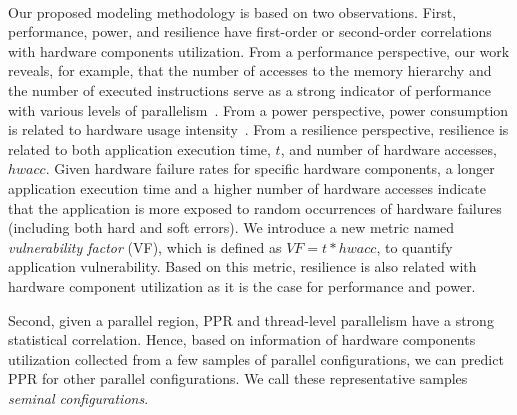 \documentclass{article}  %
\begin{document}


\vspace{10pt}

  \\
Our proposed modeling methodology is based on two observations.
First, performance, power, and resilience have first-order or
second-order correlations with hardware components utilization.
From a performance perspective, our work reveals, for example, that
the number of accesses to the memory hierarchy and the number of
executed instructions serve as a strong indicator of performance with
various levels of parallelism~\cite{mpiopenmp_tpds13,
  mpiopenmp_ipdps10, dct_pmbs11, dct_iiswc12}. 
From a power perspective, power consumption is related to hardware
usage intensity~\cite{leon:14:characterizing,mpiopenmp_tpds13, powermodel_sigmetrics03, powermodel_micro03}.
From a resilience perspective, resilience is related to both
application execution time, $t$, and number of hardware accesses,
$hwacc$. Given hardware failure rates for specific hardware
components, a longer application execution time and a higher number of 
hardware accesses indicate that the application is more exposed to
random occurrences of hardware failures (including both hard and soft
errors). We introduce a new metric named \textit{vulnerability
  factor} (VF), which is defined as $VF = t*hwacc$, to quantify
application vulnerability. Based on this metric, resilience is also
related with hardware component utilization as it is the case for
performance and power. 

 
Second, given a parallel region, PPR and thread-level parallelism have
a strong statistical correlation.  Hence, based on information of
hardware components utilization collected from a few samples of
parallel configurations, 
we can predict PPR for other parallel configurations. 
We call these representative samples \textit{seminal configurations}.
\end{document}
